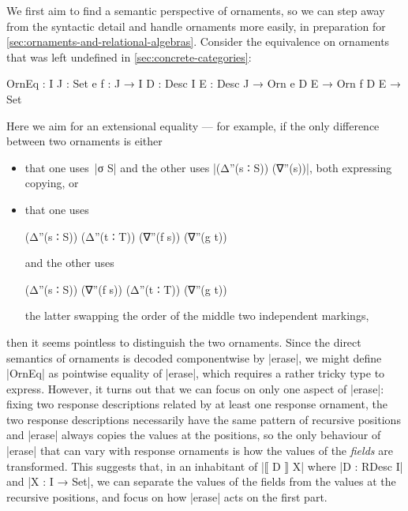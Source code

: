 We first aim to find a semantic perspective of ornaments, so we can step away from the syntactic detail and handle ornaments more easily, in preparation for \autoref{sec:ornaments-and-relational-algebras}.
Consider the equivalence on ornaments that was left undefined in \autoref{sec:concrete-categories}:
\begin{code}
OrnEq :  {I J : Set} {e f : J → I} {D : Desc I} {E : Desc J} →
         Orn e D E → Orn f D E → Set
\end{code}
Here we aim for an extensional equality --- for example, if the only difference between two ornaments is either
\begin{itemize}
\item that one uses~|σ S| and the other uses |(Δ''(s ∶ S)) (∇''(s))|, both expressing copying, or
\item that one uses
\begin{code}
(Δ''(s ∶ S)) (Δ''(t ∶ T)) (∇''(f s)) (∇''(g t))
\end{code}
and the other uses
\begin{code}
(Δ''(s ∶ S)) (∇''(f s)) (Δ''(t ∶ T)) (∇''(g t))
\end{code}
the latter swapping the order of the middle two independent markings,
\end{itemize}
then it seems pointless to distinguish the two ornaments.
Since the direct semantics of ornaments is decoded componentwise by |erase|, we might define |OrnEq| as pointwise equality of |erase|, which requires a rather tricky type to express.
However, it turns out that we can focus on only one aspect of |erase|: fixing two response descriptions related by at least one response ornament, the two response descriptions necessarily have the same pattern of recursive positions and |erase| always copies the values at the positions, so the only behaviour of |erase| that can vary with response ornaments is how the values of the \emph{fields} are transformed.
This suggests that, in an inhabitant of |⟦ D ⟧ X| where |D : RDesc I| and |X : I → Set|, we can separate the values of the fields from the values at the recursive positions, and focus on how |erase| acts on the first part.

